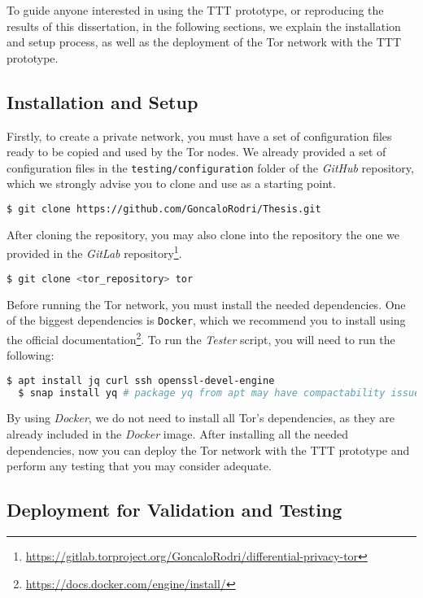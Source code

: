 To guide anyone interested in using the TTT prototype, or reproducing the results of this dissertation, in the following sections, we explain the installation and setup process, as well as the deployment of the Tor network with the TTT prototype.


\subsection{Installation and Setup}\label{subsec:installation_and_setup}

Firstly, to create a private network, you must have a set of configuration files ready to be copied and used by the Tor nodes. We already provided a set of configuration files in the \texttt{testing/configuration} folder of the \textit{GitHub} repository, which we strongly advise you to clone and use as a starting point. 
\begin{lstlisting}[language=bash]
  $ git clone https://github.com/GoncaloRodri/Thesis.git
\end{lstlisting}

After cloning the repository, you may also clone into the repository the one we provided in the \textit{GitLab} repository\footnote{\url{https://gitlab.torproject.org/GoncaloRodri/differential-privacy-tor}}.
\begin{lstlisting}[language=bash]
  $ git clone <tor_repository> tor
\end{lstlisting}

Before running the Tor network, you must install the needed dependencies. One of the biggest dependencies is \texttt{Docker}, which we recommend you to install using the official documentation\footnote{\url{https://docs.docker.com/engine/install/}}. To run the \textit{Tester} script, you will need to run the following:
\begin{lstlisting}[language=bash]
  $ apt install jq curl ssh openssl-devel-engine
  $ snap install yq # package yq from apt may have compactability issues
\end{lstlisting}

By using \textit{Docker}, we do not need to install all Tor's dependencies, as they are already included in the \textit{Docker} image. After installing all the needed dependencies, now you can deploy the Tor network with the TTT prototype and perform any testing that you may consider adequate.

\subsection{Deployment for Validation and Testing}\label{subsec:deployment_for_validation_and_testing}


